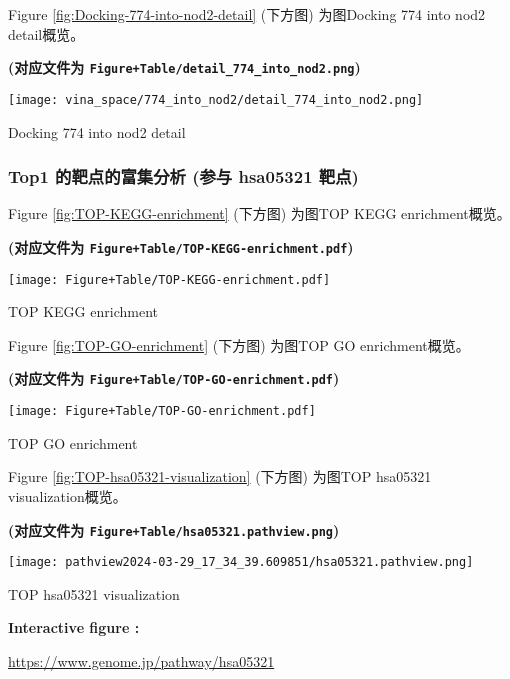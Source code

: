 \documentclass[
]{article}
\begin{document}
Figure \ref{fig:Docking-774-into-nod2-detail} (下方图) 为图Docking 774 into nod2 detail概览。

\textbf{(对应文件为 \texttt{Figure+Table/detail\_774\_into\_nod2.png})}

\def\@captype{figure}
\begin{center}
\texttt{[image: vina\_space/774\_into\_nod2/detail\_774\_into\_nod2.png]}
\caption{Docking 774 into nod2 detail}\label{fig:Docking-774-into-nod2-detail}
\end{center}

\hypertarget{top1-ux7684ux9776ux70b9ux7684ux5bccux96c6ux5206ux6790-ux53c2ux4e0e-hsa05321-ux9776ux70b9}{%
\subsubsection{Top1 的靶点的富集分析 (参与 hsa05321 靶点)}\label{top1-ux7684ux9776ux70b9ux7684ux5bccux96c6ux5206ux6790-ux53c2ux4e0e-hsa05321-ux9776ux70b9}}

Figure \ref{fig:TOP-KEGG-enrichment} (下方图) 为图TOP KEGG enrichment概览。

\textbf{(对应文件为 \texttt{Figure+Table/TOP-KEGG-enrichment.pdf})}

\def\@captype{figure}
\begin{center}
\texttt{[image: Figure+Table/TOP-KEGG-enrichment.pdf]}
\caption{TOP KEGG enrichment}\label{fig:TOP-KEGG-enrichment}
\end{center}

Figure \ref{fig:TOP-GO-enrichment} (下方图) 为图TOP GO enrichment概览。

\textbf{(对应文件为 \texttt{Figure+Table/TOP-GO-enrichment.pdf})}

\def\@captype{figure}
\begin{center}
\texttt{[image: Figure+Table/TOP-GO-enrichment.pdf]}
\caption{TOP GO enrichment}\label{fig:TOP-GO-enrichment}
\end{center}

Figure \ref{fig:TOP-hsa05321-visualization} (下方图) 为图TOP hsa05321 visualization概览。

\textbf{(对应文件为 \texttt{Figure+Table/hsa05321.pathview.png})}

\def\@captype{figure}
\begin{center}
\texttt{[image: pathview2024-03-29\_17\_34\_39.609851/hsa05321.pathview.png]}
\caption{TOP hsa05321 visualization}\label{fig:TOP-hsa05321-visualization}
\end{center}
\begin{center}\begin{tcolorbox}[colback=gray!10, colframe=gray!50, width=0.9\linewidth, arc=1mm, boxrule=0.5pt]
\textbf{
Interactive figure
:}

\vspace{0.5em}

    \url{https://www.genome.jp/pathway/hsa05321}

\vspace{2em}
\end{tcolorbox}
\end{center}
\end{document}
